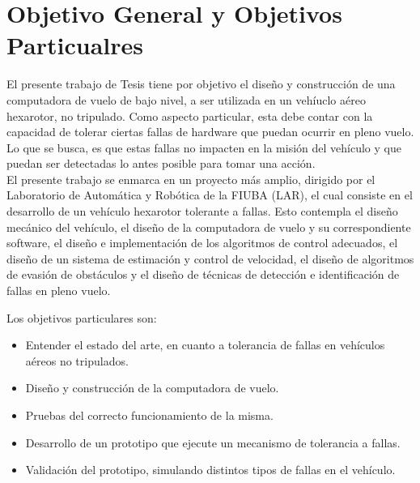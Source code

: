 \section{Objetivo General y Objetivos Particualres}

El presente trabajo de Tesis tiene por objetivo el diseño y construcción de una computadora de vuelo de bajo nivel, a ser utilizada en un vehíuclo aéreo hexarotor, no tripulado. Como aspecto particular, esta debe contar con la capacidad de tolerar ciertas fallas de hardware que puedan ocurrir en pleno vuelo. Lo que se busca, es que estas fallas no impacten en la misión del vehículo y que puedan ser detectadas lo antes posible para tomar una acción.\\

El presente trabajo se enmarca en un proyecto más amplio, dirigido por el Laboratorio de Automática y Robótica de la FIUBA (LAR), el cual consiste en el desarrollo de un vehículo hexarotor tolerante a fallas. Esto contempla el diseño mecánico del vehículo, el diseño de la computadora de vuelo y su correspondiente software, el diseño e implementación de los algoritmos de control adecuados, el diseño de un sistema de estimación y control de velocidad, el diseño de algoritmos de evasión de obstáculos y el diseño de técnicas de detección e identificación de fallas en pleno vuelo.

Los objetivos particulares son:

\begin{itemize}
    \item Entender el estado del arte, en cuanto a tolerancia de fallas en vehículos aéreos no tripulados.
    \item Diseño y construcción de la computadora de vuelo.
    \item Pruebas del correcto funcionamiento de la misma.
    \item Desarrollo de un prototipo que ejecute un mecanismo de tolerancia a fallas.
    \item Validación del prototipo, simulando distintos tipos de fallas en el vehículo.
\end{itemize}